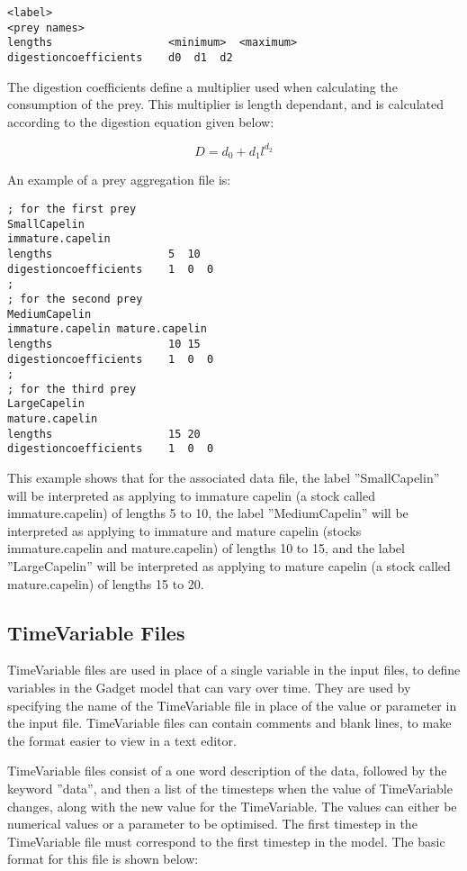 \documentclass [a4paper, 10pt]{book}
\begin{document}
{\small\begin{verbatim}
<label>
<prey names>
lengths                  <minimum>  <maximum>
digestioncoefficients    d0  d1  d2
\end{verbatim}}

The digestion coefficients define a multiplier used when calculating the consumption of the prey.  This multiplier is length dependant, and is calculated according to the digestion equation given below:

\begin{equation}\label{eq:digestion}
D = d_{0} + d_{1}l^{d_{2}}
\end{equation}

\bigskip
An example of a prey aggregation file is:

{\small\begin{verbatim}
; for the first prey
SmallCapelin
immature.capelin
lengths                  5  10
digestioncoefficients    1  0  0
;
; for the second prey
MediumCapelin
immature.capelin mature.capelin
lengths                  10 15
digestioncoefficients    1  0  0
;
; for the third prey
LargeCapelin
mature.capelin
lengths                  15 20
digestioncoefficients    1  0  0
\end{verbatim}}

This example shows that for the associated data file, the label ''SmallCapelin'' will be interpreted as applying to immature capelin (a stock called immature.capelin) of lengths 5 to 10, the label ''MediumCapelin'' will be interpreted as applying to immature and mature capelin (stocks immature.capelin and mature.capelin) of lengths 10 to 15, and the label ''LargeCapelin'' will be interpreted as applying to mature capelin (a stock called mature.capelin) of lengths 15 to 20.

\newpage %
\subsection{TimeVariable Files}
TimeVariable files are used in place of a single variable in the input files, to define variables in the Gadget model that can vary over time.  They are used by specifying the name of the TimeVariable file in place of the value or parameter in the input file.  TimeVariable files can contain comments and blank lines, to make the format easier to view in a text editor.

\bigskip
TimeVariable files consist of a one word description of the data, followed by the keyword ''data'', and then a list of the timesteps when the value of TimeVariable changes, along with the new value for the TimeVariable.  The values can either be numerical values or a parameter to be optimised.  The first timestep in the TimeVariable file must correspond to the first timestep in the model.  The basic format for this file is shown below:
\end{document}
